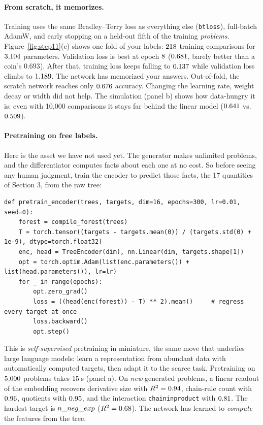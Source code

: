 \documentclass[11pt]{article}
\theoremstyle{definition}
\theoremstyle{plain}
\theoremstyle{remark}
\newcommand{\code}[1]{\texttt{#1}}
\renewcommand{\_}{\oldunderscore\allowbreak}
\newcommand{\file}[1]{\textcolor{blue!50!black}{\texttt{#1}}}
\newcommand{\codefrom}[1]{\par\smallskip\noindent{\footnotesize\textbf{From} \file{#1}}}
\begin{document}
\paragraph{From scratch, it memorizes.}
Training uses the same Bradley--Terry loss as everything else (\code{bt\_loss}), full-batch AdamW, and early stopping on a held-out fifth of the training
\emph{problems}. Figure~\ref{fig:step11}(c) shows one fold of your labels: $218$ training comparisons for $3{,}104$ parameters. Validation loss is best at epoch $8$
($0.681$, barely better than a coin's $0.693$). After that, training loss keeps falling to $0.137$ while validation loss climbs to $1.189$. The network has
memorized your answers. Out-of-fold, the scratch network reaches only $0.676$ accuracy. Changing the learning rate, weight decay or width did not help. The simulation (panel b)
shows how data-hungry it is: even with 10{,}000 comparisons it stays far behind the linear model ($0.641$ vs.\ $0.509$).

\paragraph{Pretraining on free labels.}
Here is the asset we have not used yet. The generator makes unlimited problems, and the differentiator computes facts about each one at no cost. So before seeing
any human judgment, train the encoder to predict those facts, the 17 quantities of Section 3, from the raw tree:

\codefrom{src/calcdiff/models/tree\_net.py}
\begin{lstlisting}
def pretrain_encoder(trees, targets, dim=16, epochs=300, lr=0.01, seed=0):
    forest = compile_forest(trees)
    T = torch.tensor((targets - targets.mean(0)) / (targets.std(0) + 1e-9), dtype=torch.float32)
    enc, head = TreeEncoder(dim), nn.Linear(dim, targets.shape[1])
    opt = torch.optim.Adam(list(enc.parameters()) + list(head.parameters()), lr=lr)
    for _ in range(epochs):
        opt.zero_grad()
        loss = ((head(enc(forest)) - T) ** 2).mean()     # regress every target at once
        loss.backward()
        opt.step()
\end{lstlisting}
This is \emph{self-supervised} pretraining in miniature, the same move that underlies large language models: learn a representation from abundant data with automatically
computed targets, then adapt it to the scarce task. Pretraining on $5{,}000$ problems takes $15$\,s (panel a). On \emph{new} generated problems, a linear readout of the
embedding recovers derivative size with $R^2=0.94$, chain-rule count with $0.96$, quotients with $0.95$, and the interaction \code{chain\_in\_product} with
$0.81$. The hardest target is $\NRsqMinName$ ($R^2=0.68$). The network has learned to \emph{compute} the features from the tree.
\end{document}
